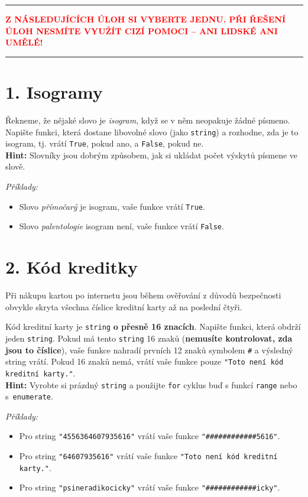 \documentclass[a4paper,11pt]{article}
\newcommand{\clr}{\textcolor{red}}
\begin{document}
\thispagestyle{empty}

\hrule
\vspace*{-1em}
\begin{center}
 \clr{\textbf{Z NÁSLEDUJÍCÍCH ÚLOH SI VYBERTE JEDNU. PŘI ŘEŠENÍ ÚLOH 
  NESMÍTE VYUŽÍT CIZÍ POMOCI -- ANI LIDSKÉ ANI UMĚLÉ!}}
\end{center}
\hrule

\section*{1. Isogramy}

Řekneme, že nějaké slovo je \emph{isogram}, když se v něm neopakuje žádné
písmeno. Napište funkci, která dostane libovolné slovo (jako \texttt{string}) a
rozhodne, zda je to isogram, tj. vrátí \texttt{True}, pokud ano, a
\texttt{False}, pokud ne.\\
\textbf{Hint:} Slovníky jsou dobrým způsobem, jak si ukládat počet výskytů
písmene ve slově.

\emph{Příklady:}
\begin{itemize}
 \item Slovo \emph{přímočarý} je isogram, vaše funkce vrátí \texttt{True}.
 \item Slovo \emph{palentologie} isogram není, vaše funkce vrátí \texttt{False}.
\end{itemize}

\clearpage

\section*{2. Kód kreditky}

Při nákupu kartou po internetu jsou během ověřování z důvodů bezpečnosti obvykle
skryta všechna číslice kreditní karty až na poslední čtyři.

Kód kreditní karty je \texttt{string} \textbf{o přesně 16 znacích}. Napište
funkci, která obdrží jeden \texttt{string}. Pokud má tento \texttt{string} 16
znaků (\textbf{nemusíte kontrolovat, zda jsou to číslice}), vaše funkce nahradí
prvních 12 znaků symbolem \texttt{\#} a výsledný string vrátí. Pokud 16 znaků
nemá, vrátí vaše funkce pouze \texttt{"Toto není kód kreditní karty."}.\\
\textbf{Hint:} Vyrobte si prázdný \texttt{string} a použijte \texttt{for} cyklus
buď s funkcí \texttt{range} nebo s~\texttt{enumerate}.

\emph{Příklady:}
\begin{itemize}
 \item Pro string \texttt{"4556364607935616"} vrátí vaše funkce
  \texttt{"\#\#\#\#\#\#\#\#\#\#\#\#5616"}.
 \item Pro string \texttt{"64607935616"} vrátí vaše funkce \texttt{"Toto není
  kód kreditní karty."}.
 \item Pro string \texttt{"psineradikocicky"} vrátí vaše funkce
  \texttt{"\#\#\#\#\#\#\#\#\#\#\#\#icky"}.
\end{itemize}
\end{document}
